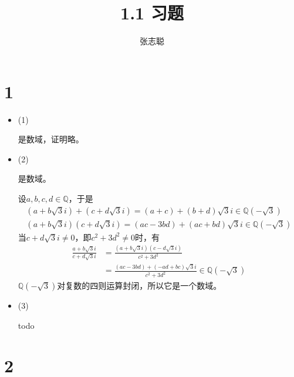 \documentclass{article}
\begin{document}
\title{1.1 习题}
\author{张志聪}
\maketitle

\section*{1}

\begin{itemize}
      \item (1)

            是数域，证明略。
      \item (2)

            是数域。

            设$a, b, c, d \in \mathbb{Q}$，于是
            \begin{align*}
                  (a + b\sqrt{3}i) + (c + d\sqrt{3}i) = (a + c) + (b + d)\sqrt{3}i \in \mathbb{Q}(-\sqrt{3}) \\
                  (a + b\sqrt{3}i) (c + d\sqrt{3}i) = (ac - 3bd) + (ac + bd)\sqrt{3}i \in \mathbb{Q}(-\sqrt{3})
            \end{align*}
            当$c + d\sqrt{3}i \neq 0$，即$c^2 + 3d^2 \neq 0$时，有
            \begin{align*}
                  \frac{a + b\sqrt{3}i}{c + d\sqrt{3}i}
                   & = \frac{(a + b\sqrt{3}i)(c - d\sqrt{3}i)}{c^2 + 3d^2}                           \\
                   & = \frac{(ac - 3bd) + (-ad + bc)\sqrt{3}i}{c^2 + 3d^2} \in \mathbb{Q}(-\sqrt{3})
            \end{align*}
            $\mathbb{Q}(-\sqrt{3})$对复数的四则运算封闭，所以它是一个数域。

      \item (3)

            todo



\end{itemize}

\section*{2}
\end{document}
